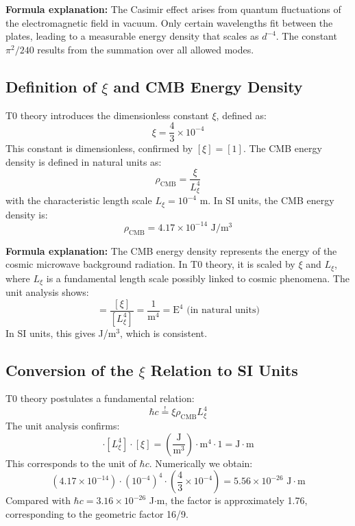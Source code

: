 	\textbf{Formula explanation:} The Casimir effect arises from quantum fluctuations of the electromagnetic field in vacuum. Only certain wavelengths fit between the plates, leading to a measurable energy density that scales as $d^{-4}$. The constant $\pi^2/240$ results from the summation over all allowed modes.
	
	\subsection{Definition of $\xi$ and CMB Energy Density}
	T0 theory introduces the dimensionless constant $\xi$, defined as:
	\begin{equation}
		\xi = \frac{4}{3} \times 10^{-4}
	\end{equation}
	This constant is dimensionless, confirmed by $[\xi] = [1]$. The CMB energy density is defined in natural units as:
	\begin{equation}
		\rho_{\text{CMB}} = \frac{\xi}{L_\xi^4}
	\end{equation}
	with the characteristic length scale $L_\xi = 10^{-4}$ m. In SI units, the CMB energy density is:
	\begin{equation}
		\rho_{\text{CMB}} = 4.17 \times 10^{-14} \text{ J}/\text{m}^3
	\end{equation}
	
	\textbf{Formula explanation:} The CMB energy density represents the energy of the cosmic microwave background radiation. In T0 theory, it is scaled by $\xi$ and $L_\xi$, where $L_\xi$ is a fundamental length scale possibly linked to cosmic phenomena. The unit analysis shows:
	\begin{equation}
		[\rho_{\text{CMB}}] = \frac{[\xi]}{[L_\xi^4]} = \frac{1}{\text{m}^4} = \text{E}^4 \text{ (in natural units)}
	\end{equation}
	In SI units, this gives J/m$^3$, which is consistent.
	
	\subsection{Conversion of the $\xi$ Relation to SI Units}
	T0 theory postulates a fundamental relation:
	\begin{equation}
		\hbar c \stackrel{!}{=} \xi \rho_{\text{CMB}} L_\xi^4
	\end{equation}
	The unit analysis confirms:
	\begin{equation}
		[\rho_{\text{CMB}}] \cdot [L_\xi^4] \cdot [\xi] = \left( \frac{\text{J}}{\text{m}^3} \right) \cdot \text{m}^4 \cdot 1 = \text{J} \cdot \text{m}
	\end{equation}
	This corresponds to the unit of $\hbar c$. Numerically we obtain:
	\begin{equation}
		\left( 4.17 \times 10^{-14} \right) \cdot \left( 10^{-4} \right)^4 \cdot \left( \frac{4}{3} \times 10^{-4} \right) = 5.56 \times 10^{-26} \text{ J} \cdot \text{m}
	\end{equation}
	Compared with $\hbar c = 3.16 \times 10^{-26}$ J$\cdot$m, the factor is approximately 1.76, corresponding to the geometric factor 16/9.
	

